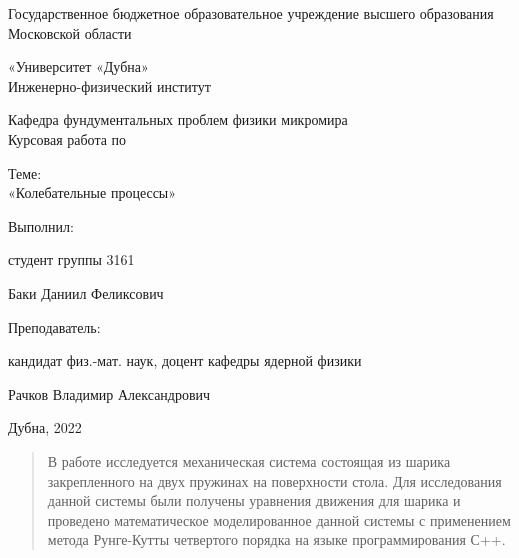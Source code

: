 \documentclass[a4paper,12pt,titlepage]{article}
\theoremstyle{definition}
\theoremstyle{theorem}
\theoremstyle{definition}
\begin{document}
\thispagestyle{empty}
\begin{center}
    \large
Государственное бюджетное образовательное учреждение
высшего образования Московской области

«Университет «Дубна»\\[15pt]

Инженерно-физический институт

Кафедра фундументальных проблем физики микромира\\[15pt]

Курсовая работа по 

Теме:\\[15pt]

«Колебательные процессы»\\[105pt]
\end{center}

\begin{flushright}
Выполнил:

студент группы 3161

Баки Даниил Феликсович

Преподаватель:

кандидат физ.-мат. наук, доцент кафедры ядерной физики 

Рачков Владимир Александрович\\[250pt]

\end{flushright}

\begin{center}
    Дубна, 2022
\end{center}
\newpage
\begin{abstract}
    В работе исследуется механическая система состоящая из шарика закрепленного на двух 
    пружинах на поверхности стола. Для исследования данной системы были получены 
    уравнения движения для шарика и проведено математическое моделированное данной системы 
    с применением метода Рунге-Кутты четвертого порядка на языке программирования С++.
\end{abstract}
\tableofcontents
\newpage
\end{document}
